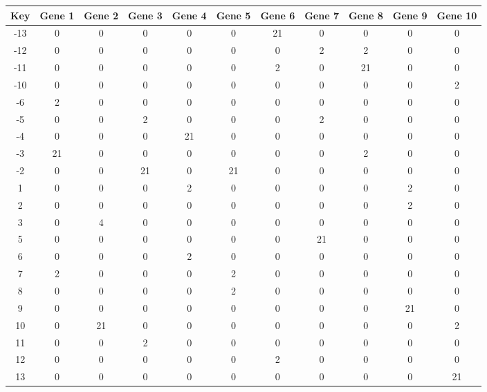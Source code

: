 \begin{tabular}{|c|c|c|c|c|c|c|c|c|c|c|}
\hline
Key & Gene 1 & Gene 2 & Gene 3 & Gene 4 & Gene 5 & Gene 6 & Gene 7 & Gene 8 & Gene 9 & Gene 10 \\
\hline
-13 & 0 & 0 & 0 & 0 & 0 & 21 & 0 & 0 & 0 & 0 \\
-12 & 0 & 0 & 0 & 0 & 0 & 0 & 2 & 2 & 0 & 0 \\
-11 & 0 & 0 & 0 & 0 & 0 & 2 & 0 & 21 & 0 & 0 \\
-10 & 0 & 0 & 0 & 0 & 0 & 0 & 0 & 0 & 0 & 2 \\
-6 & 2 & 0 & 0 & 0 & 0 & 0 & 0 & 0 & 0 & 0 \\
-5 & 0 & 0 & 2 & 0 & 0 & 0 & 2 & 0 & 0 & 0 \\
-4 & 0 & 0 & 0 & 21 & 0 & 0 & 0 & 0 & 0 & 0 \\
-3 & 21 & 0 & 0 & 0 & 0 & 0 & 0 & 2 & 0 & 0 \\
-2 & 0 & 0 & 21 & 0 & 21 & 0 & 0 & 0 & 0 & 0 \\
1 & 0 & 0 & 0 & 2 & 0 & 0 & 0 & 0 & 2 & 0 \\
2 & 0 & 0 & 0 & 0 & 0 & 0 & 0 & 0 & 2 & 0 \\
3 & 0 & 4 & 0 & 0 & 0 & 0 & 0 & 0 & 0 & 0 \\
5 & 0 & 0 & 0 & 0 & 0 & 0 & 21 & 0 & 0 & 0 \\
6 & 0 & 0 & 0 & 2 & 0 & 0 & 0 & 0 & 0 & 0 \\
7 & 2 & 0 & 0 & 0 & 2 & 0 & 0 & 0 & 0 & 0 \\
8 & 0 & 0 & 0 & 0 & 2 & 0 & 0 & 0 & 0 & 0 \\
9 & 0 & 0 & 0 & 0 & 0 & 0 & 0 & 0 & 21 & 0 \\
10 & 0 & 21 & 0 & 0 & 0 & 0 & 0 & 0 & 0 & 2 \\
11 & 0 & 0 & 2 & 0 & 0 & 0 & 0 & 0 & 0 & 0 \\
12 & 0 & 0 & 0 & 0 & 0 & 2 & 0 & 0 & 0 & 0 \\
13 & 0 & 0 & 0 & 0 & 0 & 0 & 0 & 0 & 0 & 21 \\
\hline
\end{tabular}